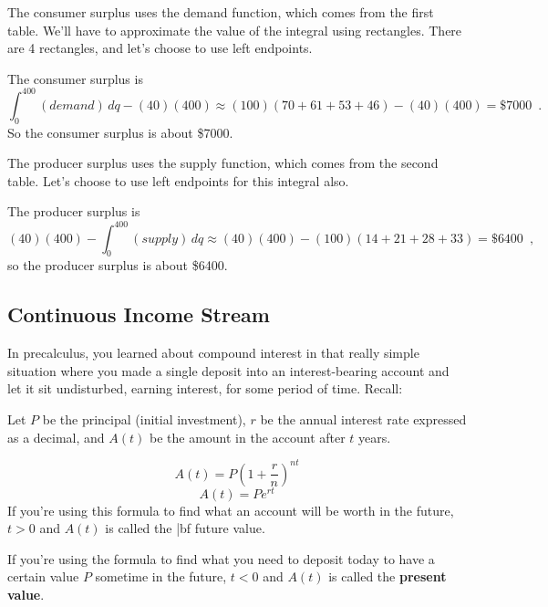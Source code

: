 \begin{example}
\begin{enumerate}[label=(\alph*)]
    \begin{solution}
      The consumer surplus uses the demand function, which comes from the first table. We'll have to approximate the value of the integral using rectangles. There are 4 rectangles, and let's choose to use left endpoints.

      The consumer surplus is
      $$\int_0^{400}(demand)\,dq - (40)(400) \approx   (100)(70+61+53+46)-(40)(400)=\$7000 \enspace .$$
      So the consumer surplus is about \$7000.

      The producer surplus uses the supply function, which comes from the second table. Let's choose to use left endpoints for this integral also.

      The producer surplus is
      $$(40)(400) - \int_0^{400}(supply)\,dq\approx   (40)(400)-(100)(14+21+28+33)=\$6400 \enspace ,$$
      so the producer surplus is about \$6400.
    \end{solution}
  \end{enumerate}
\end{example}

\subsection{Continuous Income Stream}
In precalculus, you learned about compound interest in that really simple situation where you made a single deposit into an interest-bearing account and let it sit undisturbed, earning interest, for some period of time. Recall:

\begin{definition}
Let $P$ be the principal (initial investment), $r$ be the annual interest rate expressed as a decimal, and $A(t)$ be the amount in the account after $t$ years.

$$A(t)=P\left(1+\frac{r}{n}\right)^{nt}$$
$$A(t)=Pe^{rt}$$
If you're using this formula to find what an account will be worth in the future, $t>0$ and $A(t)$ is called the {|bf future value}.

If you're using the formula to find what you need to deposit today to have a certain value $P$ sometime in the future, $t<0$ and $A(t)$ is called the {\bf present value}.
\end{definition}


